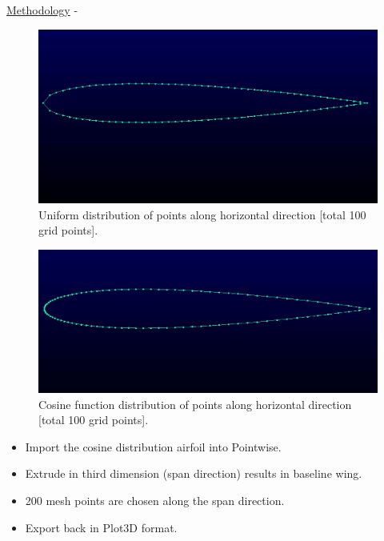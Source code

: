 \begin{frame}[allowframebreaks]{\underline{Methodology} -}
{\begin{figure}
    \includegraphics[scale = 0.12]{figures/airfoil_uniform_points.png}
    \caption{Uniform distribution of points along horizontal direction [total 100 grid points].}
    \label{uniform_points_airfoil}
\end{figure}
}
\parbox{0.45\linewidth}{
\begin{figure}  
    \centering
    \includegraphics[scale = 0.13]{figures/airfoil_cosine.png}
    \caption{Cosine function distribution of points along horizontal direction [total 100 grid points].}
    \label{cosine_points_airfoil}
\end{figure}
}
\parbox{0.4\linewidth}{
\begin{itemize}
\item Import the cosine distribution airfoil into Pointwise.
\item Extrude in third dimension (span direction) results in baseline wing.
\item 200 mesh points are chosen along the span direction.
\item Export back in Plot3D format.
\end{itemize}
}
\parbox{0.5\linewidth}{
\begin{figure}
    \centering

\end{figure}}
\end{frame}
